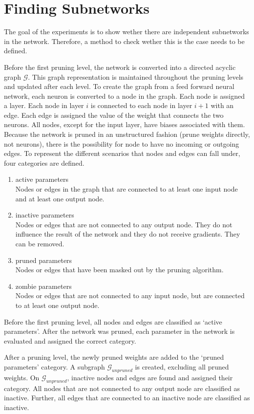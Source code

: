 \section{Finding Subnetworks}
The goal of the experiments is to show wether there are independent subnetworks in the network.
Therefore, a method to check wether this is the case needs to be defined.

Before the first pruning level, the network is converted into a directed acyclic graph $\mathcal{G}$.
This graph representation is maintained throughout the pruning levels and updated after each level.
To create the graph from a feed forward neural network, each neuron is converted to a node in the graph.
Each node is assigned a layer.
Each node in layer $i$ is connected to each node in layer $i+1$ with an edge.
Each edge is assigned the value of the weight that connects the two neurons.
All nodes, except for the input layer, have biases associated with them.
Because the network is pruned in an unstructured fashion (prune weights directly, not neurons), there is the possibility for node to have no incoming or outgoing edges.
To represent the different scenarios that nodes and edges can fall under, four categories are defined.

\begin{enumerate}
\item active parameters  \\
Nodes or edges in the graph that are connected to at least one input node and at least one output node.
\item inactive parameters \\
Nodes or edges that are not connected to any output node. They do not influence the result of the network and they do not receive gradients. They can be removed.
\item pruned parameters \\
Nodes or edges that have been masked out by the pruning algorithm.
\item zombie parameters \\
Nodes or edges that are not connected to any input node, but are connected to at least one output node.
\end{enumerate}

Before the first pruning level, all nodes and edges are classified as `active parameters'.
After the network was pruned, each parameter in the network is evaluated and assigned the correct category.

After a pruning level, the newly pruned weights are added to the `pruned parameters' category.
A subgraph $\mathcal{G}_{unpruned}$ is created, excluding all pruned weights.
On $\mathcal{G}_{unpruned}$, inactive nodes and edges are found and assigned their category.
All nodes that are not connected to any output node are classified as inactive.
Further, all edges that are connected to an inactive node are classified as inactive.

